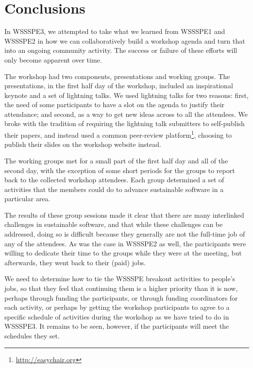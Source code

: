 \documentclass[11pt, oneside]{amsart}
\begin{document}


%









\section{Conclusions} \label{sec:conclusions}

In WSSSPE3, we attempted to take what we learned from WSSSPE1 and WSSSPE2 in how
we can collaboratively build a workshop agenda and turn that into an ongoing
community activity. The success or failure of these efforts will
only become apparent over time.

The workshop had two components, presentations and working groups. The
presentations, in the first half day of the workshop, included an inspirational
keynote and a set of lightning talks. We used lightning talks for two reasons:
first, the need of some participants to have a slot on the agenda to justify
their attendance; and second, as a way to get new ideas across to all the
attendees. We broke with the tradition of requiring the lightning talk
submitters to self-publish their papers, and instead used a common peer-review
platform\footnote{\url{http://easychair.org}}, choosing to publish their slides
on the workshop website instead.

The working groups met for a small part of the first half day and all of the
second day, with the exception of some short periods for the groups to report
back to the collected workshop attendees. Each group determined a set of
activities that the members could do to advance sustainable software in a
particular area.

The results of these group sessions made it clear that there are many
interlinked challenges in sustainable software, and that while these challenges
can be addressed, doing so is difficult because they generally are not the
full-time job of any of the attendees. As was the case in WSSSPE2 as well, the
participants were willing to dedicate their time to the groups while they were
at the meeting, but afterwards, they went back to their (paid) jobs.

We need to determine how to tie the WSSSPE breakout activities to people's jobs,
so that they feel that continuing them is a higher priority than it is now,
perhaps through funding the participants, or through funding coordinators for
each activity, or perhaps by getting the workshop participants to agree to a
specific schedule of activities during the workshop as we have tried to do in
WSSSPE3. It remains to be seen, however, if the participants will meet the
schedules they set.
\end{document}
